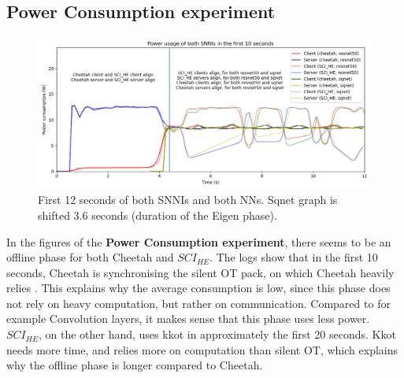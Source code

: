 \documentclass[../thesis.tex]{subfiles}
\begin{document}
\subsection{Power Consumption experiment}\label{subsection:discuss_power}
\begin{figure}[ht]
    \centering
    \includegraphics[width=.8\linewidth]{Thesis/Images/mean_first10secs.png} 
    \caption{First 12 seconds of both SNNIs and both NNs. Sqnet graph is shifted 3.6 seconds (duration of the Eigen phase).}
    \label{fig:first10secs}
\end{figure}
In the figures of the \textbf{Power Consumption experiment}, there seems to be an offline phase for both Cheetah and $SCI_{HE}$. The logs show that in the first 10 seconds, Cheetah is synchronising the silent OT pack, on which Cheetah heavily relies \parencite[p. 4]{cheetah}. This explains why the average consumption is low, since this phase does not rely on heavy computation, but rather on communication. Compared to for example Convolution layers, it makes sense that this phase uses less power. $SCI_{HE}$, on the other hand, uses kkot in approximately the first 20 seconds. Kkot needs more time, and relies more on computation than silent OT, which explains why the offline phase is longer compared to Cheetah.
\end{document}
